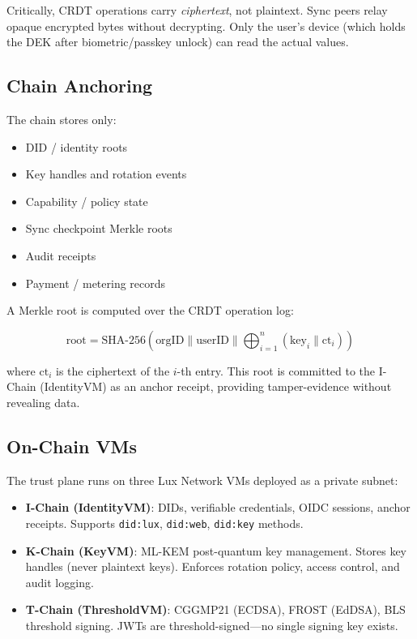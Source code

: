 \documentclass[twocolumn,11pt]{article}
\begin{document}
Critically, CRDT operations carry \textit{ciphertext}, not plaintext. Sync peers relay opaque encrypted bytes without decrypting. Only the user's device (which holds the DEK after biometric/passkey unlock) can read the actual values.

\subsection{Chain Anchoring}

The chain stores only:

\begin{itemize}
\item DID / identity roots
\item Key handles and rotation events
\item Capability / policy state
\item Sync checkpoint Merkle roots
\item Audit receipts
\item Payment / metering records
\end{itemize}

A Merkle root is computed over the CRDT operation log:

\begin{equation}
\text{root} = \text{SHA-256}\left(\text{orgID} \| \text{userID} \| \bigoplus_{i=1}^{n} (\text{key}_i \| \text{ct}_i)\right)
\end{equation}

where $\text{ct}_i$ is the ciphertext of the $i$-th entry. This root is committed to the I-Chain (IdentityVM) as an anchor receipt, providing tamper-evidence without revealing data.

\subsection{On-Chain VMs}

The trust plane runs on three Lux Network VMs deployed as a private subnet:

\begin{itemize}
\item \textbf{I-Chain (IdentityVM)}: DIDs, verifiable credentials, OIDC sessions, anchor receipts. Supports \texttt{did:lux}, \texttt{did:web}, \texttt{did:key} methods.
\item \textbf{K-Chain (KeyVM)}: ML-KEM post-quantum key management. Stores key handles (never plaintext keys). Enforces rotation policy, access control, and audit logging.
\item \textbf{T-Chain (ThresholdVM)}: CGGMP21 (ECDSA), FROST (EdDSA), BLS threshold signing. JWTs are threshold-signed---no single signing key exists.
\end{itemize}
\end{document}
